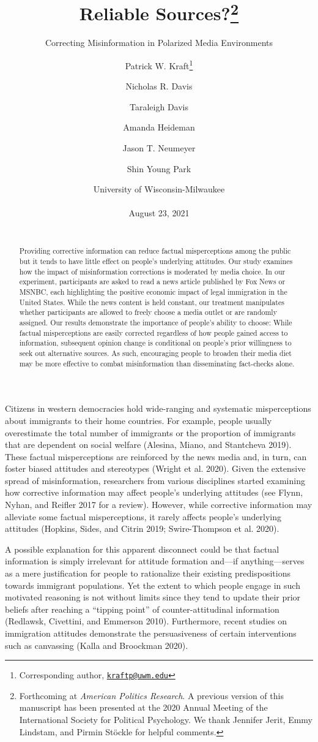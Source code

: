 \documentclass[
  12pt,
]{article}
\title{Reliable Sources?\footnote{Forthcoming at \emph{American Politics
  Research}. A previous version of this manuscript has been presented at
  the 2020 Annual Meeting of the International Society for Political
  Psychology. We thank Jennifer Jerit, Emmy Lindstam, and Pirmin Stöckle
  for helpful comments.}}
\subtitle{Correcting Misinformation in Polarized Media Environments
\vspace{1em}}
\author{Patrick W. Kraft\footnote{Corresponding author,
  \href{mailto:kraftp@uwm.edu}{\nolinkurl{kraftp@uwm.edu}}} \and Nicholas
R. Davis \and Taraleigh Davis \and Amanda Heideman \and Jason T.
Neumeyer \and Shin Young Park}
\date{\hfill\break
University of Wisconsin-Milwaukee\\
~\\
August 23, 2021\\
~\\}
\begin{document}
\maketitle
\begin{abstract}
\noindent Providing corrective information can reduce factual
misperceptions among the public but it tends to have little effect on
people's underlying attitudes. Our study examines how the impact of
misinformation corrections is moderated by media choice. In our
experiment, participants are asked to read a news article published by
Fox News or MSNBC, each highlighting the positive economic impact of
legal immigration in the United States. While the news content is held
constant, our treatment manipulates whether participants are allowed to
freely choose a media outlet or are randomly assigned. Our results
demonstrate the importance of people's ability to choose: While factual
misperceptions are easily corrected regardless of how people gained
access to information, subsequent opinion change is conditional on
people's prior willingness to seek out alternative sources. As such,
encouraging people to broaden their media diet may be more effective to
combat misinformation than disseminating fact-checks alone.
\end{abstract}

\thispagestyle{empty}
\clearpage
\setcounter{page}{1}
\doublespace

\StopCensoring

\noindent Citizens in western democracies hold wide-ranging and
systematic misperceptions about immigrants to their home countries. For
example, people usually overestimate the total number of immigrants or
the proportion of immigrants that are dependent on social welfare
(Alesina, Miano, and Stantcheva 2019). These factual misperceptions are
reinforced by the news media and, in turn, can foster biased attitudes
and stereotypes (Wright et al. 2020). Given the extensive spread of
misinformation, researchers from various disciplines started examining
how corrective information may affect people's underlying attitudes (see
Flynn, Nyhan, and Reifler 2017 for a review). However, while corrective
information may alleviate some factual misperceptions, it rarely affects
people's underlying attitudes (Hopkins, Sides, and Citrin 2019;
Swire-Thompson et al. 2020).

A possible explanation for this apparent disconnect could be that
factual information is simply irrelevant for attitude formation and---if
anything---serves as a mere justification for people to rationalize
their existing predispositions towards immigrant populations. Yet the
extent to which people engage in such motivated reasoning is not without
limits since they tend to update their prior beliefs after reaching a
``tipping point'' of counter-attitudinal information (Redlawsk,
Civettini, and Emmerson 2010). Furthermore, recent studies on
immigration attitudes demonstrate the persuasiveness of certain
interventions such as canvassing (Kalla and Broockman 2020).
\end{document}
